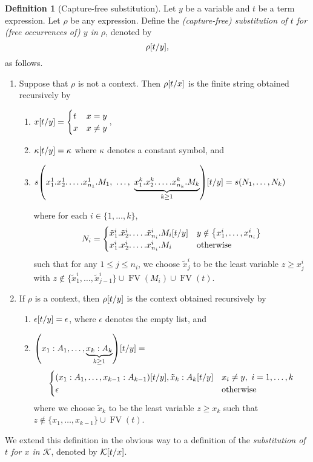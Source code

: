\documentclass[10pt,letterpaper,cm]{nupset}
\theoremstyle{definition}
\newtheorem{definition}{Definition}[subsection]
\theoremstyle{theorem}
\theoremstyle{remark}
\newcommand{\K}{\mathcal K}
\newcommand{\0}{\mathbf{0}}
\newcommand{\1}{\mathbf{1}}
\newcommand{\2}{\mathbf{2}}
\DeclareMathOperator{\fv}{FV}
\newcommand{\be}{\begin{enumerate}}
\newcommand{\ee}{\end{enumerate}}
\begin{document}
\begin{definition}[Capture-free substitution] Let $y$ be a variable and $t$ be a term expression. Let $\rho$ be any expression. Define the \textit{(capture-free) substitution of $t$ for (free occurrences of) $y$ in $\rho$}, denoted by $$ \rho\mleft[t/y\mright] ,   $$ as follows.
\be
\item Suppose that $\rho$ is not a context.  Then $\rho\mleft[t/x\mright]$ is the finite string obtained recursively by
\be
\item $x\mleft[t/y\mright] = \begin{cases} t & x = y \\ x & x\ne y\end{cases} , $
\item $\kappa\mleft[t/y\mright]  = \kappa$ where $\kappa$ denotes a constant symbol, and
\item 

 $s\mleft(x^1_1.x^1_2.\ldots.x^1_{n_1}.M_{1},\ \ldots,\  \underbrace{x^k_1.x^k_2.\ldots.x^k_{n_k}.M_{k}}_{k\geq 1}\mright)\mleft[t/y\mright]   =
  s\mleft(N_1, \ldots, N_k \mright)$

where for each $i\in \{1, \ldots, k\}$,
\[
N_i = 
\begin{cases}
\tilde{x}^i_1.\tilde{x}^i_2.\ldots.\tilde{x}^i_{n_i}.M_{i}\mleft[t/y\mright]  & y \notin \mleft\{x^i_1, \ldots, x^i_{n_i}\mright\} \\ 
x^i_1.x^i_2.\ldots.x^i_{n_i}.M_{i} &  \text{otherwise}
\end{cases}
\]
such that for any $1\leq j \leq n_i$, we choose $\tilde{x}_j^i$ to be the least variable $z \geq x_j^i$ with \linebreak $z \notin \{\tilde{x}^i_1, \ldots, \tilde{x}_{j-1}^i\} \cup \fv(M_i) \cup \fv(t)$.
\ee
\item If $\rho$ is a context, then $ \rho\mleft[t/y\mright]$ is the context obtained recursively by
\be
\item $\epsilon\mleft[t/y\mright] = \epsilon$, where $\epsilon$ denotes the empty list, and
\item $\mleft(x_1 : A_1, \ldots, \underbrace{x_k :A_k}_{k\geq 1}\mright)\mleft[t/y\mright] = $
\[ \begin{cases}
(x_1 :A _1, \ldots, x_{k-1} : A_{k-1})\mleft[t/y\mright], \tilde{x}_k :A_k\mleft[t/y\mright] & x_i \ne y, \ i = 1, \ldots, k
\\
\epsilon & \text{otherwise}
\end{cases}
\]  where we choose $\tilde{x}_k$ to be the least variable $z \geq x_k$ such that $z\notin \{x_1, \ldots, x_{k-1}\} \cup \fv(t)$.
\ee
\ee
We extend this definition in the obvious way to a definition of the \textit{substitution of $t$ for $x$ in $\K$}, denoted by $\K\mleft[t/x\mright]$.
\end{definition}
\end{document}
